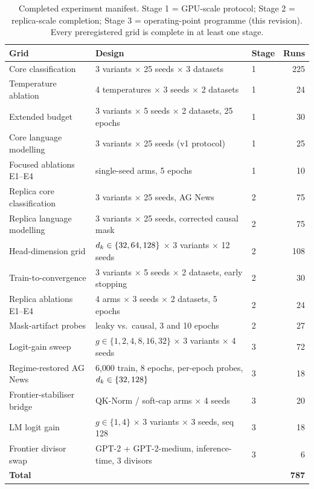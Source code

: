 \begin{table}[t]
  \centering
  \caption{Completed experiment manifest. Stage 1 = GPU-scale protocol;
  Stage 2 = replica-scale completion; Stage 3 = operating-point programme
  (this revision). Every preregistered grid is complete in at least one
  stage.}
  \label{tab:manifest}
  \small
  \begin{tabular*}{\textwidth}{@{\extracolsep{\fill}} l l l r}
    \toprule
    \textbf{Grid} & \textbf{Design} & \textbf{Stage} & \textbf{Runs} \\
    \midrule
    Core classification & 3 variants $\times$ 25 seeds $\times$ 3 datasets & 1 & 225 \\
    Temperature ablation & 4 temperatures $\times$ 3 seeds $\times$ 2 datasets & 1 & 24 \\
    Extended budget & 3 variants $\times$ 5 seeds $\times$ 2 datasets, 25 epochs & 1 & 30 \\
    Core language modelling & 3 variants $\times$ 25 seeds (v1 protocol) & 1 & 25 \\
    Focused ablations E1--E4 & single-seed arms, 5 epochs & 1 & 10 \\
    \midrule
    Replica core classification & 3 variants $\times$ 25 seeds, AG News & 2 & 75 \\
    Replica language modelling & 3 variants $\times$ 25 seeds, corrected causal mask & 2 & 75 \\
    Head-dimension grid & $d_k \in \{32,64,128\}$ $\times$ 3 variants $\times$ 12 seeds & 2 & 108 \\
    Train-to-convergence & 3 variants $\times$ 5 seeds $\times$ 2 datasets, early stopping & 2 & 30 \\
    Replica ablations E1--E4 & 4 arms $\times$ 3 seeds $\times$ 2 datasets, 5 epochs & 2 & 24 \\
    Mask-artifact probes & leaky vs.\ causal, 3 and 10 epochs & 2 & 27 \\
    \midrule
    Logit-gain sweep & $g \in \{1,2,4,8,16,32\}$ $\times$ 3 variants $\times$ 4 seeds & 3 & 72 \\
    Regime-restored AG News & 6{,}000 train, 8 epochs, per-epoch probes, $d_k \in \{32,128\}$ & 3 & 18 \\
    Frontier-stabiliser bridge & QK-Norm / soft-cap arms $\times$ 4 seeds & 3 & 20 \\
    LM logit gain & $g \in \{1,4\}$ $\times$ 3 variants $\times$ 3 seeds, seq 128 & 3 & 18 \\
    Frontier divisor swap & GPT-2 + GPT-2-medium, inference-time, 3 divisors & 3 & 6 \\
    \midrule
    \textbf{Total} & & & \textbf{787} \\
    \bottomrule
  \end{tabular*}
\end{table}

